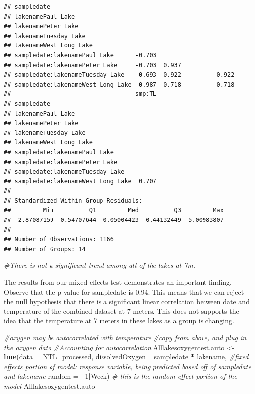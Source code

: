 \documentclass[12pt,]{article}
\newenvironment{Shaded}{\begin{snugshade}}{\end{snugshade}}
\newcommand{\KeywordTok}[1]{\textcolor[rgb]{0.13,0.29,0.53}{\textbf{#1}}}
\newcommand{\DataTypeTok}[1]{\textcolor[rgb]{0.13,0.29,0.53}{#1}}
\newcommand{\DecValTok}[1]{\textcolor[rgb]{0.00,0.00,0.81}{#1}}
\newcommand{\StringTok}[1]{\textcolor[rgb]{0.31,0.60,0.02}{#1}}
\newcommand{\CommentTok}[1]{\textcolor[rgb]{0.56,0.35,0.01}{\textit{#1}}}
\newcommand{\OperatorTok}[1]{\textcolor[rgb]{0.81,0.36,0.00}{\textbf{#1}}}
\newcommand{\NormalTok}[1]{#1}
\begin{document}
\begin{verbatim}
## sampledate                                                            
## lakenamePaul Lake                                                     
## lakenamePeter Lake                                                    
## lakenameTuesday Lake                                                  
## lakenameWest Long Lake                                                
## sampledate:lakenamePaul Lake      -0.703                              
## sampledate:lakenamePeter Lake     -0.703  0.937                       
## sampledate:lakenameTuesday Lake   -0.693  0.922          0.922        
## sampledate:lakenameWest Long Lake -0.987  0.718          0.718        
##                                   smp:TL
## sampledate                              
## lakenamePaul Lake                       
## lakenamePeter Lake                      
## lakenameTuesday Lake                    
## lakenameWest Long Lake                  
## sampledate:lakenamePaul Lake            
## sampledate:lakenamePeter Lake           
## sampledate:lakenameTuesday Lake         
## sampledate:lakenameWest Long Lake  0.707
## 
## Standardized Within-Group Residuals:
##         Min          Q1         Med          Q3         Max 
## -2.87087159 -0.54707644 -0.05004423  0.44132449  5.00983807 
## 
## Number of Observations: 1166
## Number of Groups: 14
\end{verbatim}

\begin{Shaded}
\begin{Highlighting}[]
\CommentTok{#There is not a significant trend among all of the lakes at 7m.}
\end{Highlighting}
\end{Shaded}

The results from our mixed effects test demonstrates an important
finding. Observe that the p-value for sampledate is 0.94. This means
that we can reject the null hypothesis that there is a significant
linear correlation between date and temperature of the combined dataset
at 7 meters. This does not supports the idea that the temperature at 7
meters in these lakes as a group is changing.

\begin{Shaded}
\begin{Highlighting}[]
\CommentTok{#oxygen may be autocorrelated with temperature}
\CommentTok{#copy from above, and plug in the oxygen data}
\CommentTok{#Accounting for autocorrelation}
\NormalTok{Alllakesoxygentest.auto <-}\StringTok{ }\KeywordTok{lme}\NormalTok{(}\DataTypeTok{data =}\NormalTok{ NTL_processed, }
\NormalTok{                     dissolvedOxygen }\OperatorTok{~}\StringTok{ }\NormalTok{sampledate }\OperatorTok{*}\StringTok{ }\NormalTok{lakename, }\CommentTok{#fixed effects portion of model: response variable, being predicted based off of sampledate and lakename}
                     \DataTypeTok{random =} \OperatorTok{~}\DecValTok{1}\OperatorTok{|}\NormalTok{Week)  }\CommentTok{# this is the random effect portion of the model}
\NormalTok{Alllakesoxygentest.auto}
\end{Highlighting}
\end{Shaded}
\end{document}
